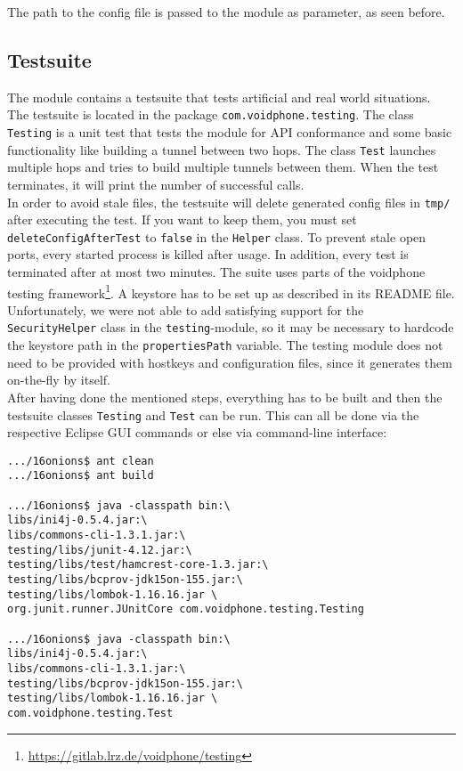 \documentclass{article}
\begin{document}
The path to the config file is passed to the module as parameter, as seen before.
	
\subsection{Testsuite}
The module contains a testsuite that tests artificial and real world situations. The testsuite is
located in the package \texttt{com.voidphone.testing}. The class \texttt{Testing} is a unit test
that tests the module for API conformance and some basic functionality like building a tunnel
between two hops. The class \texttt{Test} launches multiple hops and tries to build multiple
tunnels between them. When the test terminates, it will print the number of successful calls. \\
In order to avoid stale files, the testsuite will delete generated config files in \texttt{tmp/}
after executing the test. If you want to keep them, you must set \texttt{deleteConfigAfterTest}
to \texttt{false} in the \texttt{Helper} class. To prevent stale open ports, every started process
is killed after usage. In addition, every test is terminated after at most two minutes.
The suite uses parts of the voidphone testing framework\footnote{\url{https://gitlab.lrz.de/voidphone/testing}}. A keystore has to be set up as described in its README file. Unfortunately, we were not able to add satisfying support for the \texttt{SecurityHelper} class in
the \texttt{testing}-module, so it may be necessary to hardcode the keystore path in the
\texttt{propertiesPath} variable.
The testing module does not need to be provided with hostkeys and configuration files, since it generates them on-the-fly by itself. \\
After having done the mentioned steps, everything has to be built and then the testsuite classes \texttt{Testing} and  \texttt{Test} can be run. This can all be done via the respective Eclipse GUI commands or else via command-line interface:

\begin{lstlisting}
.../16onions$ ant clean
.../16onions$ ant build

.../16onions$ java -classpath bin:\
libs/ini4j-0.5.4.jar:\
libs/commons-cli-1.3.1.jar:\
testing/libs/junit-4.12.jar:\
testing/libs/test/hamcrest-core-1.3.jar:\
testing/libs/bcprov-jdk15on-155.jar:\
testing/libs/lombok-1.16.16.jar \
org.junit.runner.JUnitCore com.voidphone.testing.Testing

.../16onions$ java -classpath bin:\
libs/ini4j-0.5.4.jar:\
libs/commons-cli-1.3.1.jar:\
testing/libs/bcprov-jdk15on-155.jar:\
testing/libs/lombok-1.16.16.jar \
com.voidphone.testing.Test
\end{lstlisting}
\end{document}
